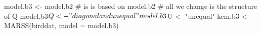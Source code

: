 \begin{Schunk}
\begin{Sinput}
 model.b3 <- model.b2 # is is based on model.b2
 # all we change is the structure of Q
 model.b3$Q <- "diagonal and unequal"
 model.b3$U <- "unequal"
 kem.b3 <- MARSS(birddat, model = model.b3)
\end{Sinput}
\end{Schunk}
